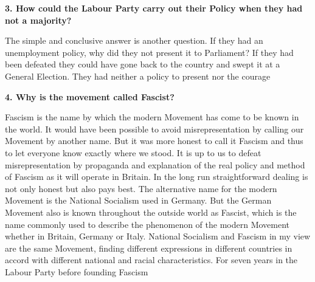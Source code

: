 \documentclass{book}
\begin{document}
\begin{flushright}
\textbf{3. How could the Labour Party carry out their Policy
    when they had not a majority?}

The simple and conclusive answer is another question. If they had an unemployment policy, why
did they not present it to Parliament? If they had been defeated they could have gone back to the
country and swept it at a General Election. They had neither a policy to present nor the courage
\end{flushright}

\begin{flushleft}
\textbf{4. Why is the movement called Fascist?}

Fascism is the name by which the modern Movement has come to be known in the world. It
would have been possible to avoid misrepresentation by calling our Movement by another name.
But it was more honest to call it Fascism and thus to let everyone know exactly where we stood.
It is up to us to defeat misrepresentation by propaganda and explanation of the real policy and
method of Fascism as it will operate in Britain. In the long run straightforward dealing is not
only honest but also pays best. The alternative name for the modern Movement is the National
Socialism used in Germany. But the German Movement also is known throughout the outside
world as Fascist, which is the name commonly used to describe the phenomenon of the modern
Movement whether in Britain, Germany or Italy. National Socialism and Fascism in my view are
the same Movement, finding different expressions in different countries in accord with different
national and racial characteristics. For seven years in the Labour Party before founding Fascism
\end{flushleft}
\end{document}
